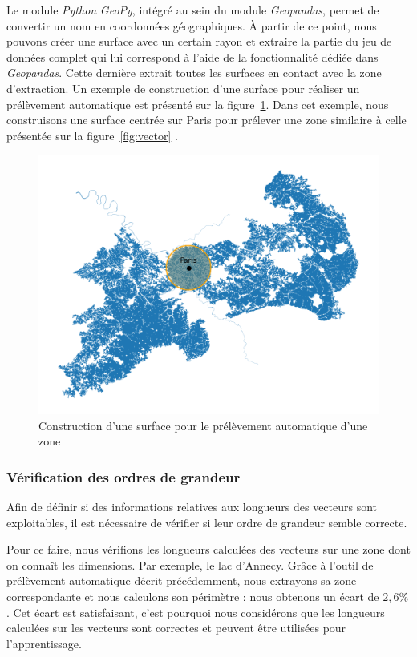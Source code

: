 Le module \emph{Python} \emph{GeoPy}, intégré au sein du module \emph{Geopandas}, permet de convertir un nom en coordonnées géographiques.
À partir de ce point, nous pouvons créer une surface avec un certain rayon et extraire la partie du jeu de données complet qui lui correspond à l'aide de la fonctionnalité dédiée dans \emph{Geopandas}.
Cette dernière extrait toutes les surfaces en contact avec la zone d'extraction.
Un exemple de construction d'une surface pour réaliser un prélèvement automatique est présenté sur la figure~\ref{fig:zone-paris}.
Dans cet exemple, nous construisons une surface centrée sur Paris pour prélever une zone similaire à celle présentée sur la figure~\ref{fig:vector} .

\begin{figure}[!h]
    \centering
    \includegraphics[scale=0.5]{images/zone-paris}
    \caption{Construction d'une surface pour le prélèvement automatique d'une zone}
    \label{fig:zone-paris}
\end{figure}

\subsubsection{Vérification des ordres de grandeur}

Afin de définir si des informations relatives aux longueurs des vecteurs sont exploitables, il est nécessaire de vérifier si leur ordre de grandeur semble correcte.

Pour ce faire, nous vérifions les longueurs calculées des vecteurs sur une zone dont on connaît les dimensions.
Par exemple, le lac d'Annecy.
Grâce à l'outil de prélèvement automatique décrit précédemment, nous extrayons sa zone correspondante et nous calculons son périmètre : nous obtenons un écart de $2,6\%$.
Cet écart est satisfaisant, c'est pourquoi nous considérons que les longueurs calculées sur les vecteurs sont correctes et peuvent être utilisées pour l'apprentissage.

